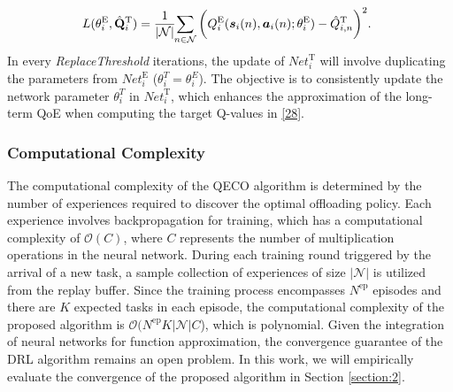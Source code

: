\documentclass[10pt, journal,letterpaper]{IEEEtran}
\begin{document}
	
\begin{alignat}{1}
	\hspace{-2mm}L(\theta_i^{\text{E}},\hat{\mathbf{Q}}_i^{\text{T}}) = {1 \over |\mathcal{N}| }\hspace{-1mm} \sum\limits_{n \in \mathcal{N}} \bigg(Q_i^{\text{E}}(\boldsymbol{s}_i(n) , \boldsymbol{a}_i(n); \theta_i^{\text{E}} ) -   \hat{Q}^{\text{T}}_{i,n}  \bigg)^2.
	\label{30}  
\end{alignat}  
In every \textit{ReplaceThreshold} iterations, the update of $\textit{Net}_i^{\text{T}}$ will involve duplicating the parameters from $\textit{Net}_i^{\text{E}}$ ($\theta_i^{T} = \theta_i^{E}$). The objective is to consistently update the network parameter $\theta_i^{T}$ in $\textit{Net}_i^{\text{T}}$, which enhances the approximation of the long-term QoE when computing the target Q-values in \eqref{28}.\\

\subsubsection{Computational Complexity}


The computational complexity of the QECO algorithm is determined by the number of experiences required to discover the optimal offloading policy. Each experience involves backpropagation for training, which has a computational complexity of $\mathcal{O}(C)$, where $C$ represents the number of multiplication operations in the neural network. During each training round triggered by the arrival of a new task, a sample collection of experiences of size $|\mathcal{N}|$ is utilized from the replay buffer. Since the training process encompasses $N^{\text{ep}}$ episodes and there are $K$ expected tasks in each episode, the computational complexity of the proposed algorithm is $\mathcal{O}(N^{\text{ep}}K|\mathcal{N}|C$), which is polynomial. Given the integration of neural networks for function approximation, the convergence guarantee of the DRL algorithm remains an open problem. In this work, we will empirically evaluate the convergence of the proposed algorithm in Section \ref{section:2}.

\end{document}
